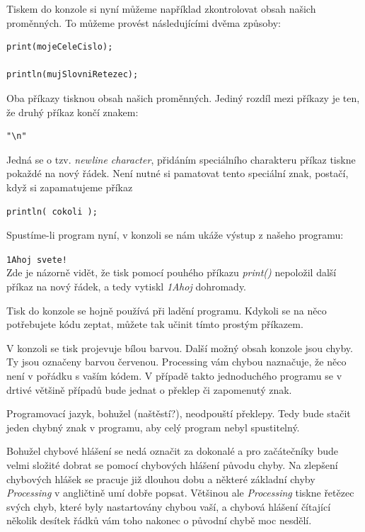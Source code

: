 \documentclass[10pt,twoside=true,open=right,cleardoublepage=empty,chapterprefix=true]{scrbook}
\newcommand{\vyraz}[1]{\textit{\gls{#1}}\index{#1}\label{#1}}
\newcommand{\console}[1]{\texttt{\footnotesize #1}}
\begin{document}
Tiskem do konzole si nyní můžeme například zkontrolovat obsah našich proměnných. To můžeme provést následujícími dvěma způsoby:


\begin{lstlisting}
print(mojeCeleCislo);

println(mujSlovniRetezec);
\end{lstlisting}

Oba příkazy tisknou obsah našich proměnných. Jediný rozdíl mezi příkazy je ten, že druhý příkaz končí znakem:
 
\begin{lstlisting}
"\n"
\end{lstlisting}

Jedná se o tzv. {\em newline character}, přidáním speciálního charakteru příkaz tiskne pokaždé na nový řádek. Není nutné si pamatovat tento speciální znak, postačí, když si zapamatujeme příkaz 

\begin{lstlisting}
println( cokoli );

\end{lstlisting}

Spustíme-li program nyní, v konzoli se nám ukáže výstup z našeho programu:

\console{1Ahoj svete!}\\

Zde je názorně vidět, že tisk pomocí pouhého příkazu \vyraz{print()} nepoložil další příkaz na nový řádek, a tedy vytiskl {\em 1Ahoj} dohromady.

Tisk do konzole se hojně používá při ladění programu. Kdykoli se na něco potřebujete kódu zeptat, můžete tak učinit tímto prostým příkazem.

V konzoli se tisk projevuje bílou barvou. Další možný obsah konzole jsou chyby. Ty jsou označeny barvou červenou. Processing vám chybou naznačuje, že něco není v pořádku s vaším kódem. V případě takto jednoduchého programu se v drtivé většině případů bude jednat o překlep či zapomenutý znak.

Programovací jazyk, bohužel (naštěstí?), neodpouští překlepy. Tedy bude stačit jeden chybný znak v programu, aby celý program nebyl spustitelný.

Bohužel chybové hlášení se nedá označit za dokonalé a pro začátečníky bude velmi složité dobrat se pomocí chybových hlášení původu chyby. Na zlepšení chybových hlášek se pracuje již dlouhou dobu a některé základní chyby {\em Processing} v angličtině umí dobře popsat. Většinou ale {\em Processing} tiskne řetězec svých chyb, které byly nastartovány chybou vaší, a chybová hlášení čítající několik desítek řádků vám toho nakonec o původní chybě moc nesdělí.
\end{document}
